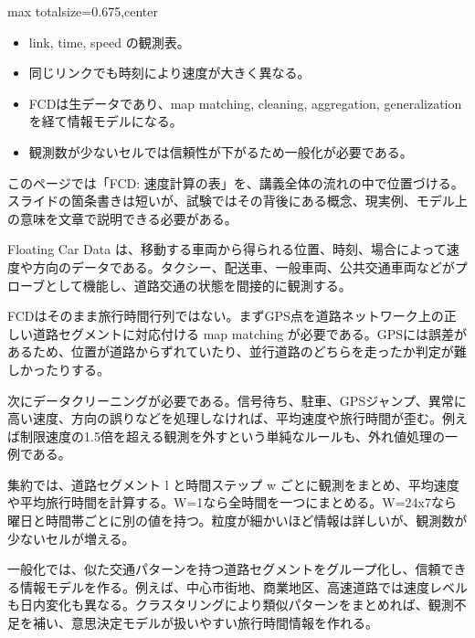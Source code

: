 \clearpage
{}
\begin{adjustbox}{max totalsize={\textwidth}{0.675\textheight},center}
\begin{minipage}{\textwidth}\scriptsize
\begin{minipage}[t]{0.485\textwidth}
\begin{itemize}
\item link, time, speed の観測表。
\item 同じリンクでも時刻により速度が大きく異なる。
\end{itemize}
\begin{itemize}
\item FCDは生データであり、map matching, cleaning, aggregation, generalization を経て情報モデルになる。
\item 観測数が少ないセルでは信頼性が下がるため一般化が必要である。
\end{itemize}
\end{minipage}\hfill
\begin{minipage}[t]{0.485\textwidth}
このページでは「FCD: 速度計算の表」を、講義全体の流れの中で位置づける。スライドの箇条書きは短いが、試験ではその背後にある概念、現実例、モデル上の意味を文章で説明できる必要がある。\par
Floating Car Data は、移動する車両から得られる位置、時刻、場合によって速度や方向のデータである。タクシー、配送車、一般車両、公共交通車両などがプローブとして機能し、道路交通の状態を間接的に観測する。\par
FCDはそのまま旅行時間行列ではない。まずGPS点を道路ネットワーク上の正しい道路セグメントに対応付ける map matching が必要である。GPSには誤差があるため、位置が道路からずれていたり、並行道路のどちらを走ったか判定が難しかったりする。\par
次にデータクリーニングが必要である。信号待ち、駐車、GPSジャンプ、異常に高い速度、方向の誤りなどを処理しなければ、平均速度や旅行時間が歪む。例えば制限速度の1.5倍を超える観測を外すという単純なルールも、外れ値処理の一例である。\par
集約では、道路セグメント l と時間ステップ w ごとに観測をまとめ、平均速度や平均旅行時間を計算する。W=1なら全時間を一つにまとめる。W=24x7なら曜日と時間帯ごとに別の値を持つ。粒度が細かいほど情報は詳しいが、観測数が少ないセルが増える。\par
一般化では、似た交通パターンを持つ道路セグメントをグループ化し、信頼できる情報モデルを作る。例えば、中心市街地、商業地区、高速道路では速度レベルも日内変化も異なる。クラスタリングにより類似パターンをまとめれば、観測不足を補い、意思決定モデルが扱いやすい旅行時間情報を作れる。\par

\end{minipage}
\end{minipage}
\end{adjustbox}
